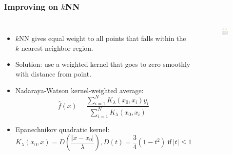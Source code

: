 \documentclass{beamer}
\begin{document}
\begin{frame}
\frametitle{Improving on $k$NN}
\begin{columns}
    \begin{itemize}
        \item $k$NN gives equal weight to all points that falls within the $k$ nearest neighbor region.
        \item Solution: use a weighted kernel that goes to zero smoothly with distance from point.
        \item Nadaraya-Watson kernel-weighted average:
        \begin{equation*}
            \hat{f}(x) = \frac{\sum_{i=1}^N K_{\lambda}(x_0,x_i)y_i}{\sum_{i=1}^N K_{\lambda}(x_0,x_i)}
        \end{equation*}
        \item Epanechnikov quadratic kernel:
        \begin{equation*}
            K_{\lambda}(x_0,x) = D(\frac{|x-x_0|}{\lambda}), D(t) = \frac{3}{4}(1-t^2)\mathrm{~if~}|t| \leq 1
        \end{equation*}
    \end{itemize}
\begin{figure}
            \centering
            \includegraphics[width=0.9\textwidth]{figures/epankernel.pdf}
        \end{figure}
\end{columns}
\end{frame}
\end{document}
